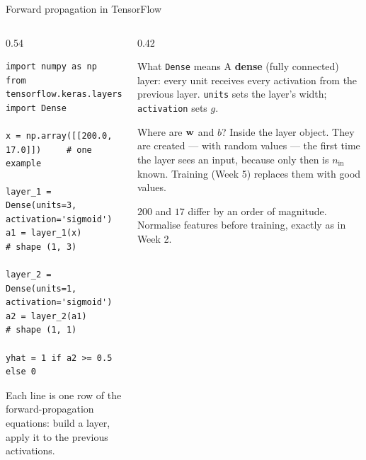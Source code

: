 \documentclass[aspectratio=169,10pt]{beamer}
\begin{document}
\begin{frame}[fragile]{Forward propagation in TensorFlow}
  \begin{columns}[T,onlytextwidth]
    \begin{column}{0.54\textwidth}
\begin{lstlisting}
import numpy as np
from tensorflow.keras.layers import Dense

x = np.array([[200.0, 17.0]])     # one example

layer_1 = Dense(units=3, activation='sigmoid')
a1 = layer_1(x)                   # shape (1, 3)

layer_2 = Dense(units=1, activation='sigmoid')
a2 = layer_2(a1)                  # shape (1, 1)

yhat = 1 if a2 >= 0.5 else 0
\end{lstlisting}
      \vspace{1mm}
      \footnotesize
      Each line is one row of the forward-propagation equations: build a layer, apply it to
      the previous activations.
    \end{column}
    \begin{column}{0.42\textwidth}
      \footnotesize
      \begin{block}{What \texttt{Dense} means}
        A \textbf{dense} (fully connected) layer: every unit receives every activation from
        the previous layer. \texttt{units} sets the layer's width; \texttt{activation} sets
        $g$.
      \end{block}
      \begin{block}{Where are $\mathbf{w}$ and $b$?}
        Inside the layer object. They are created --- with random values --- the first time
        the layer sees an input, because only then is $n_{\text{in}}$ known. Training (Week 5)
        replaces them with good values.
      \end{block}
      \begin{pitfall}
        \footnotesize $200$ and $17$ differ by an order of magnitude. Normalise features
        before training, exactly as in Week 2.
      \end{pitfall}
    \end{column}
  \end{columns}
\end{frame}
\end{document}
